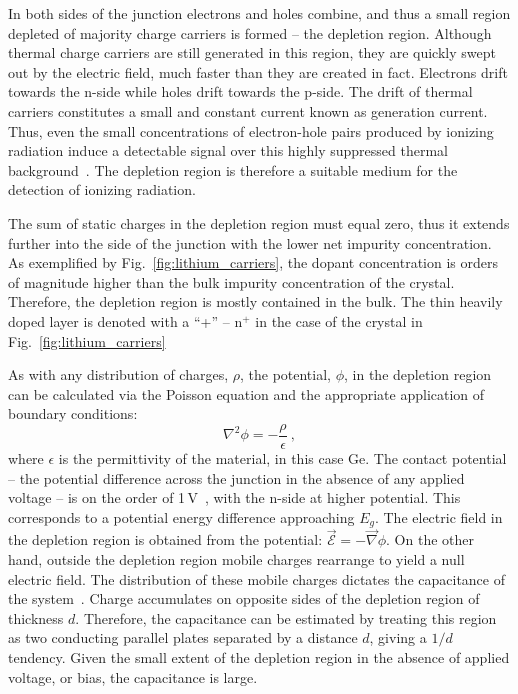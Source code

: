 In both sides of the junction electrons and holes combine, and thus a small region depleted of majority charge carriers is formed -- the depletion region. Although thermal charge carriers are still generated in this region, they are quickly swept out by the electric field, much faster than they are created in fact. Electrons drift towards the n-side while holes drift towards the p-side. The drift of thermal carriers constitutes a small and constant current known as generation current. Thus, even the small concentrations of electron-hole pairs produced by ionizing radiation induce a detectable signal over this highly suppressed thermal background~\cite{knoll}. The depletion region is therefore a suitable medium for the detection of ionizing radiation.

The sum of static charges in the depletion region must equal zero, thus it extends further into the side of the junction with the lower net impurity concentration. As exemplified by Fig.~\ref{fig:lithium_carriers}, the dopant concentration is orders of magnitude higher than the bulk impurity concentration of the crystal. Therefore, the depletion region is mostly contained in the bulk. The thin heavily doped layer is denoted with a ``+'' -- n$^+$ in the case of the crystal in Fig.~\ref{fig:lithium_carriers} 

As with any distribution of charges, $\rho$, the potential, $\phi$, in the depletion region can be calculated via the Poisson equation and the appropriate application of boundary conditions:
\begin{equation}
	\nabla^2\phi=-\frac{\rho}{\epsilon}~,
	\label{eq:piosson}
\end{equation}
where $\epsilon$ is the permittivity of the material, in this case Ge. The contact potential -- the potential difference across the junction in the absence of any applied voltage -- is on the order of 1\,V~\cite{knoll}, with the n-side at higher potential. This corresponds to a potential energy difference approaching $E_g$. The electric field in the depletion region is obtained from the potential: $\vec{\mathcal{E}} =- \vec{\nabla} \phi$. On the other hand, outside the depletion region mobile charges rearrange to yield a null electric field. The distribution of these mobile charges dictates the capacitance of the system~\cite{gefica}. Charge accumulates on opposite sides of the depletion region of thickness $d$. Therefore, the capacitance can be estimated by treating this region as two conducting parallel plates separated by a distance $d$, giving a $1/d$ tendency. Given the small extent of the depletion region in the absence of applied voltage, or bias, the capacitance is large. 

